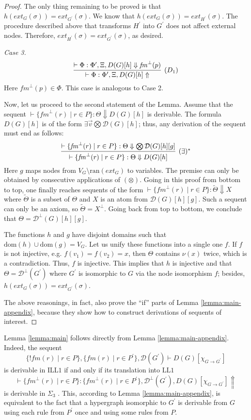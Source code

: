 \documentclass[a4paper,UKenglish,cleveref, autoref, thm-restate,pdfa]{lipics-v2021}
\newcommand{\dom}{\mathrm{dom}}
\newcommand{\ran}{\mathrm{ran}}
\newcommand{\ext}{\mathit{ext}}
\newcommand{\mconj}{\otimes}
\newcommand{\bang}{{!}}
\newcommand{\LLFO}{\mathrm{LL}1}
\newcommand{\ILLFO}{\mathrm{ILL}1}
\newcommand{\fm}{\mathit{fm}}
\newcommand{\diag}{\mathcal{D}}
\begin{document}
\begin{proof}
	The only thing remaining to be proved is that $h(\ext_G(\sigma)) = \ext_{G^\prime}(\sigma)$. We know that $h(\ext_G(\sigma)) = \ext_{H^\prime}(\sigma)$. The procedure described above that transforms $H^\prime$ into $G^\prime$ does not affect external nodes. Therefore, $\ext_{H^\prime}(\sigma)=\ext_{G^\prime}(\sigma)$, as desired.
 	
	\textit{Case 3.}
	$$
	\infer[(D_1)]
	{	\vdash \Phi : \Phi^\prime, \Xi, D(G)[h] \Uparrow	}
	{	\vdash \Phi : \Phi^\prime, \Xi, D(G)[h] \Downarrow \fm^\bot(p)		}
	$$
	Here $\fm^\bot(p) \in \Phi$. This case is analogous to Case 2.
	
	Now, let us proceed to the second statement of the Lemma. Assume that the sequent $\vdash \{\fm^\bot(r) \mid r \in P\} : \Theta \Downarrow D(G)[h]$ is derivable. The formula $D(G)[h]$ is of the form $\exists \vec{v} \bigotimes \diag(G)[h]$; thus, any derivation of the sequent must end as follows:
	$$
	\infer[(\exists)^\ast]
	{
		\vdash \{\fm^\bot(r) \mid r \in P\} : \Theta \Downarrow D(G)[h]
	}
	{
		\vdash \{\fm^\bot(r) \mid r \in P\} : \Theta \Downarrow \bigotimes \diag(G)[h][g]
	}
	$$
	Here $g$ maps nodes from $V_G \setminus \ran(\ext_G)$ to variables. The premise can only be obtained by consecutive applications of $(\mconj)$. Going in this proof from bottom to top, one finally reaches sequents of the form $\vdash \{\fm^\bot(r) \mid r \in P\} : \tilde{\Theta} \Downarrow X$ where $\tilde{\Theta}$ is a subset of $\Theta$ and $X$ is an atom from $\diag(G)[h][g]$. Such a sequent can only be an axiom, so $\tilde{\Theta}=X^\bot$. Going back from top to bottom, we conclude that $\Theta=\diag^\bot(G)[h][g]$.
	
	The functions $h$ and $g$ have disjoint domains such that $\dom(h)\cup\dom(g)=V_G$. Let us unify these functions into a single one $f$. If $f$ is not injective, e.g. $f(v_1)=f(v_2)=x$, then $\Theta$ contains $\nu(x)$ twice, which is a contradiction. Thus, $f$ is injective. This implies that $h$ is injective and that $\Theta=\diag^\bot(G^\prime)$ where $G^\prime$ is isomorphic to $G$ via the node isomorphism $f$; besides, $h(\ext_G(\sigma))=\ext_{G^\prime}(\sigma)$. 
	
	The above reasonings, in fact, also prove the ``if'' parts of Lemma \ref{lemma:main-appendix}, because they show how to construct derivations of sequents of interest.
\end{proof}

Lemma \ref{lemma:main} follows directly from Lemma \ref{lemma:main-appendix}. Indeed, the sequent 
$$
\{\bang \fm(r) \mid r \in P \}, \{\fm(r) \mid r \in P^\prime \}, \diag(G^\prime) \vdash D(G)[\chi_{G \to G^\prime}]
$$ 
is derivable in $\ILLFO$ if and only if its translation into $\LLFO$
$$
\vdash \{\fm^\bot(r) \mid r \in P \}: \{\fm^\bot(r) \mid r \in P^\prime \}, \diag^\bot(G^\prime) , D(G)[\chi_{G \to G^\prime}] \Uparrow
$$
is derivable in $\Sigma_3$ \cite[Theorems 1, 2]{Andreoli92}. This, according to Lemma \ref{lemma:main-appendix}, is equivalent to the fact that a hypergraph isomorphic to $G^\prime$ is derivable from $G$ using each rule from $P^\prime$ once and using some rules from $P$.
\end{document}

